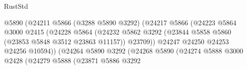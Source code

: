 \begin{lexlean}{RustStd}
\begin{coremodule}
                                                    @5890
                                                    (@24211
                                                      @5866
                                                      (@3288 @5890 @3292)
                                                      (@24217
                                                        @5866
                                                        (@24223
                                                          @5864
                                                          @3000
                                                          @2415
                                                          (@24228
                                                            @5864
                                                            (@24232
                                                              @5862
                                                              @3292
                                                              (@23844
                                                                @5858
                                                                @5860
                                                                (@23853 @5848 @3512 @23863 @11157))
                                                              @23709))
                                                          @24247
                                                          @24250
                                                          @24253
                                                          @24256
                                                          @10594))
                                                      (@24264
                                                        @5890
                                                        @3292
                                                        (@24268
                                                          @5890
                                                          (@24274
                                                            @5888
                                                            @3000
                                                            @2428
                                                            (@24279
                                                              @5888
                                                              (@23871
                                                                @5886
                                                                @3292

\end{coremodule}
\end{lexlean}

